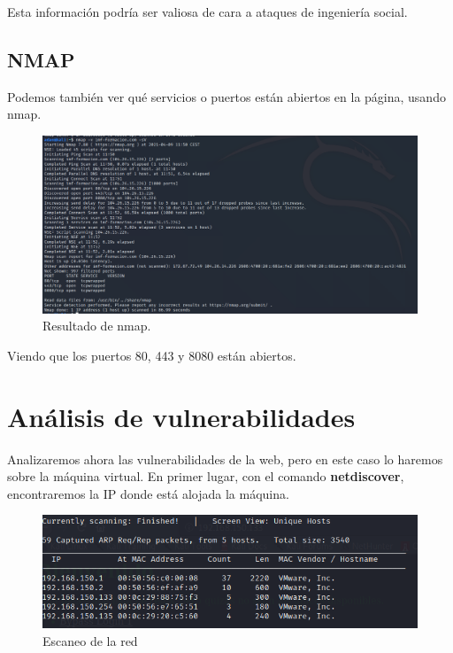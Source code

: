 \documentclass[12pt,twoside]{article}
\begin{document}
Esta información podría ser valiosa de cara a ataques de ingeniería social. 

\subsection{NMAP}
Podemos también ver qué servicios o puertos están abiertos en la página, usando nmap.

\begin{figure}[h]
    \centering
    \includegraphics[scale=0.5]{./imagenes/nmap}
    \caption{Resultado de nmap.}
\end{figure}

Viendo que los puertos 80, 443 y 8080 están abiertos.
\newpage
\section{Análisis de vulnerabilidades}

Analizaremos ahora las vulnerabilidades de la web, pero en este caso lo haremos sobre la máquina virtual. En primer lugar, con el comando \textbf{netdiscover}, encontraremos la IP donde está alojada la máquina.
\newpage
\begin{figure}[h]
    \centering
    \includegraphics[scale=0.2]{./imagenes/escaneo_red}
    \caption{Escaneo de la red}
\end{figure}
\end{document}
